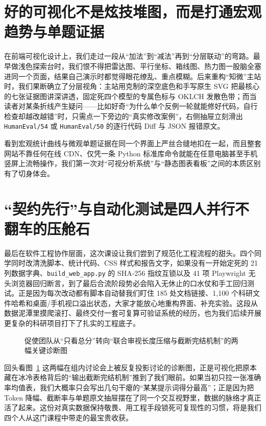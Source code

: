 \section{好的可视化不是炫技堆图，而是打通宏观趋势与单题证据}

在前端可视化设计上，我们走过一段从“加法”到“减法”再到“分层联动”的弯路。最早做浅色探索台时，我们恨不得把雷达图、平行坐标、箱线图、热力图一股脑全塞进同一个页面，结果自己演示时都觉得眼花缭乱、重点模糊。后来重构“知微”主站时，我们果断确立了分层视角：主站用克制的深空底色和手写原生 SVG 把最核心的七张证据图讲深讲透，固定死四个模型的专属色标与 OKLCH 发散色带；而当读者对某条折线产生疑问——比如好奇“为什么单个反例一轮就能修好代码，自行检查却越改越错”时，只需点一下旁边的“真实修改案例”，右侧抽屉立刻滑出 \texttt{HumanEval/54} 或 \texttt{HumanEval/50} 的逐行代码 Diff 与 JSON 报错原文。

看到宏观统计曲线与微观单题证据在同一个界面上严丝合缝地扣在一起，而且整套网站不靠任何在线 CDN、仅凭一条 Python 标准库命令就能在任意电脑甚至手机竖屏上流畅操作，我们第一次对“可视分析系统”与“静态图表看板”之间的本质区别有了切身体会。

\section{“契约先行”与自动化测试是四人并行不翻车的压舱石}

最后在软件工程协作层面，这次课设让我们尝到了规范化工程流程的甜头。四个同学同时改清洗脚本、统计代码、CSS 样式和报告文字，如果没有一开始定死的 21 列数据字典、\texttt{build\_web\_app.py} 的 SHA-256 指纹互锁以及 41 项 Playwright 无头浏览器回归断言，到了最后合流阶段势必会陷入无休止的口水仗和手工回归测试。正是因为每次改动都有脚本自动替我们盯住 185 处文档链接、1,100 个科研文件哈希和桌面/手机视口溢出状态，大家才能放心地重构界面、补充实验。这段从数据泥潭里摸爬滚打、最终交付一套可复算可验证系统的经历，也为我们后续开展更复杂的科研项目打下了扎实的工程底子。

\begin{figure}[!htbp]
\centering
{}\hfill
{}
\caption{促使团队从“只看总分”转向“联合审视长度压缩与截断完结机制”的两幅关键诊断图}
\label{fig:exp-reflection-pair}
\end{figure}

回头看图~\ref{fig:exp-reflection-pair} 这两幅在组内讨论会上被反复投影讨论的诊断图，正是可视化把原本藏在冰冷表格背后的“输出截断完结机制”推到了我们眼前。如果当初只拉一张准确率均值表，我们大概率只会写出几句干瘪的“某某提示词得分最高”；正是因为把 Token 降幅、截断率与单题原文抽屉摆在了同一个交互视野里，数据的脉络才真正活了起来。这份对真实数据保持敬畏、用工程手段锁死可复现性的习惯，将是我们四个人从这门课程中带走的最宝贵收获。


